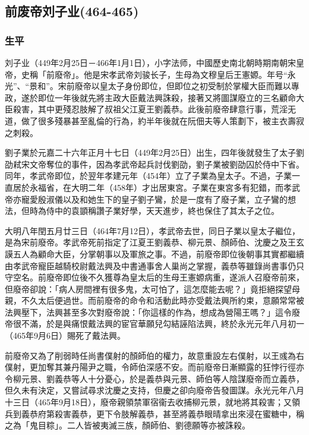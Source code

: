 
\subsection{前废帝刘子业\tiny(464-465)}

\subsubsection{生平}

刘子业（449年2月25日－466年1月1日），小字法师，中國歷史南北朝時期南朝宋皇帝，史稱「前廢帝」。他是宋孝武帝刘骏长子，生母為文穆皇后王憲嫄。年号“永光”、“景和”。宋前廢帝以皇太子身份即位，但即位之初受制於掌權大臣而難以專政，遂於即位一年後就先將主政大臣戴法興誅殺，接著又將圖謀廢立的三名顧命大臣殺害，其中更殘忍肢解了叔祖父江夏王劉義恭。此後前廢帝肆意行事，荒淫无道，做了很多殘暴甚至亂倫的行為，約半年後就在阮佃夫等人策劃下，被主衣壽寂之刺殺。

劉子業於元嘉二十六年正月十七日（449年2月25日）出生，四年後就發生了太子劉劭弒宋文帝奪位的事件，因為孝武帝起兵討伐劉劭，劉子業被劉劭囚於侍中下省。同年，孝武帝即位，於翌年孝建元年（454年）立了子業為皇太子。不過，子業一直居於永福省，在大明二年（458年）才出居東宮。子業在東宮多有犯錯，而孝武帝亦寵愛殷淑儀以及和她生下的皇子劉子鸞，於是一度有了廢子業，立子鸞的想法，但時為侍中的袁顗稱讚子業好學，天天進步，終也保住了其太子之位。

大明八年閏五月廿三日（464年7月12日），孝武帝去世，同日子業以皇太子繼位，是為宋前廢帝。孝武帝死前指定了江夏王劉義恭、柳元景、顏師伯、沈慶之及王玄謨五人為顧命大臣，分掌朝事以及軍旅之事。不過，前廢帝即位後朝事其實都繼續由孝武帝寵臣越騎校尉戴法興及中書通事舍人巢尚之掌握，義恭等雖錄尚書事仍只守空名。前廢帝即位後不久獲尊為皇太后的生母王憲嫄病重，遂派人召廢帝前來，但廢帝卻說：「病人房間裡有很多鬼，太可怕了，這怎麼能去呢？」竟拒絕探望母親，不久太后便過世。而前廢帝的命令和活動此時亦受戴法興所約束，意願常常被法興壓下，法興甚至多次對廢帝說：「你這樣的作為，想成為營陽王嗎？」這令廢帝很不滿，於是與痛恨戴法興的宦官華願兒勾結誣陷法興，終於永光元年八月初一（465年9月6日）賜死了戴法興。

前廢帝又為了削弱時任尚書僕射的顏師伯的權力，故意重設左右僕射，以王彧為右僕射，更加奪其兼丹陽尹之職，令師伯深感不安。而前廢帝日漸顯露的狂悖行徑亦令柳元景、劉義恭等人十分憂心，於是義恭與元景、師伯等人陰謀廢帝而立義恭，但久未有決定，又嘗試尋求沈慶之支持，但慶之卻向廢帝告發圖謀。永光元年八月十三日（465年9月18日），廢帝親領禁軍宿衞去收捕柳元景，就地將其殺害；又領兵到義恭府第殺害義恭，更下令肢解義恭，甚至將義恭眼晴拿出來浸在蜜糖中，稱之為「鬼目粽」。二人皆被夷滅三族，顏師伯、劉德願等亦被誅殺。

